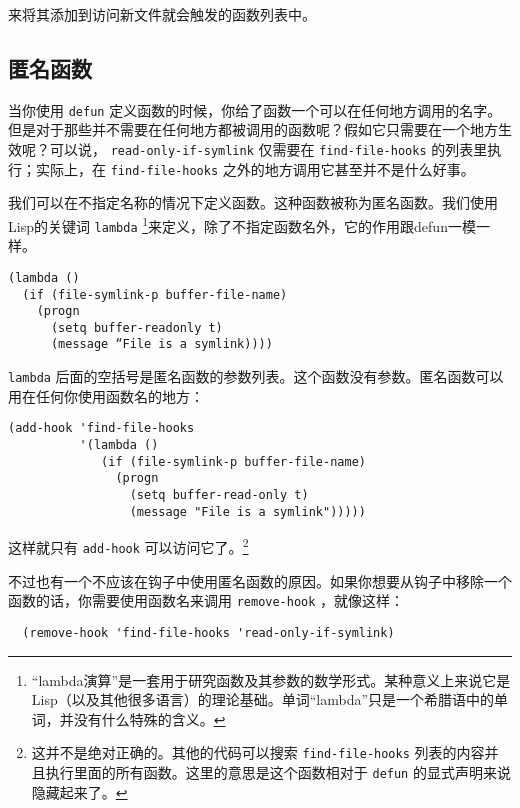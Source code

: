 来将其添加到访问新文件就会触发的函数列表中。

\subsection{匿名函数}
\label{section:02-Anonymous-Functions}

当你使用 \texttt{defun} 定义函数的时候，你给了函数一个可以在任何地方调用的名字。但是对于那些并不需要在任何地方都被调用的函数呢？假如它只需要在一个地方生效呢？可以说， \texttt{read-only-if-symlink} 仅需要在 \texttt{find-file-hooks} 的列表里执行；实际上，在 \texttt{find-file-hooks} 之外的地方调用它甚至并不是什么好事。

我们可以在不指定名称的情况下定义函数。这种函数被称为匿名函数。我们使用Lisp的关键词 \texttt{lambda} \footnote{“lambda演算”是一套用于研究函数及其参数的数学形式。某种意义上来说它是Lisp（以及其他很多语言）的理论基础。单词“lambda”只是一个希腊语中的单词，并没有什么特殊的含义。}来定义，除了不指定函数名外，它的作用跟defun一模一样。

\begin{verbatim}
(lambda ()
  (if (file-symlink-p buffer-file-name)
    (progn
      (setq buffer-readonly t)
      (message “File is a symlink))))
\end{verbatim}

 \texttt{lambda} 后面的空括号是匿名函数的参数列表。这个函数没有参数。匿名函数可以用在任何你使用函数名的地方：
\begin{verbatim}
(add-hook 'find-file-hooks
          '(lambda ()
             (if (file-symlink-p buffer-file-name)
               (progn
                 (setq buffer-read-only t)
                 (message "File is a symlink")))))
\end{verbatim}

这样就只有 \texttt{add-hook} 可以访问它了。\footnote{这并不是绝对正确的。其他的代码可以搜索 \texttt{find-file-hooks} 列表的内容并且执行里面的所有函数。这里的意思是这个函数相对于 \texttt{defun} 的显式声明来说隐藏起来了。}

不过也有一个不应该在钩子中使用匿名函数的原因。如果你想要从钩子中移除一个函数的话，你需要使用函数名来调用 \texttt{remove-hook} ，就像这样：

\begin{verbatim}
  (remove-hook 'find-file-hooks 'read-only-if-symlink)
\end{verbatim}

